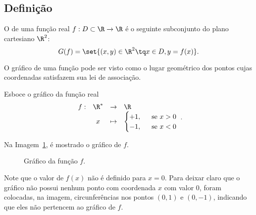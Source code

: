 \subsection{Definição}

\begin{definition}
    O  de uma função real $f : D \subset \R \to \R$ é o seguinte subconjunto do plano
cartesiano $\R^2$: $$G(f) = \set{(x,y) \in \R^2 \tq x \in D , y =
f(x)}.$$
\end{definition}

\begin{remark}
    O gráfico de uma função pode ser visto como o lugar geométrico
dos pontos cujas coordenadas satisfazem sua lei de associação.
\end{remark}

\begin{example}
    Esboce o gráfico da função real
    $$\begin{array}{cccl}
    f : & \R^\ast & \to     & \R \\
        &  x & \mapsto & \begin{cases}
                            +1,  &  \ \text{ se } x >0 \\
                            -1, &  \ \text{ se } x <0
                            \end{cases}
    \end{array}.$$
\end{example}

\begin{solution}
    Na Imagem~\ref{img:grafico-funcao-zeroum}, é mostrado o gráfico de $f$.

    \begin{figure}[ht]
    \centering
    \caption{Gráfico da função $f$.}
    \label{img:grafico-funcao-zeroum}
    \end{figure}

    Note que o valor de $f(x)$ não é definido para $x=0$.
    Para deixar claro que o gráfico não possui nenhum ponto com coordenada $x$ com valor $0$, foram colocadas, na imagem, circunferências nos pontos $(0,1)$ e $(0,-1)$, indicando que eles não pertencem ao gráfico de $f$.
\end{solution}